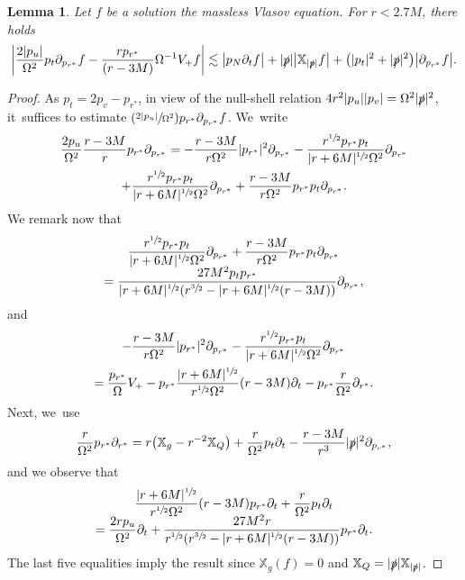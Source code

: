 \documentclass[JEP,XML,SOM,Unicode,published]{cedram}
\newcommand{\Psfrac}[2]{(\sfrac{#1}{#2})}
\theoremstyle{plain}
\newtheorem{lemma}[proposition]{Lemma}
\theoremstyle{definition}
\newcommand\T{{\mathbb{X}}}
\begin{document}
\begin{lemma}\label{LemBoundpartialpr}
Let $f$ be a solution the massless Vlasov equation. For $r < 2.7M$, there holds\vspace*{-3pt}
\[
\bigg| \frac{2|p_u|}{\Omega^2} p_t \partial_{p_{r^*}} f-\frac{rp_{r^*}}{(r-3M)} \Omega^{-1} V_+ f \bigg| \lesssim \big| p_N \partial_t f \big|+|\slashed{p}|\big| \T_{|\slashed{p}|} f \big|+ \bigl(|p_t|^2+ |\slashed{p}|^2\bigr) \big| \partial_{p_{r^*}} f \big|.
\]
\end{lemma}
\begin{proof}
As $p_t=2p_v-p_{r^*}$, in view of the null-shell relation $4r^2|p_u||p_v|=\Omega^2 |\slashed{p}|^2$, it~suffices to estimate $\Psfrac{2|p_u|}{\Omega^2} p_{r^*} \partial_{p_{r^*}} f$. We~write\vspace*{-5pt}
\begin{multline*}
\frac{2p_u}{\Omega^2}\frac{r-3M}{r} p_{r^*} \partial_{p_{r^*}} = -\frac{r-3M}{r\Omega^2}|p_{r^*}|^2 \partial_{p_{r^*}}-\frac{r^{\sfrac{1}{2}}p_{r^*}p_t}{|r+6M|^{\sfrac{1}{2}} \Omega^2} \partial_{p_{r^*}} \\
+ \frac{r^{\sfrac{1}{2}} p_{r^*}p_t}{|r+6M|^{\sfrac{1}{2}} \Omega^2} \partial_{p_{r^*}}+\frac{r-3M}{r\Omega^2}p_{r^*}p_t \partial_{p_{r^*}}.
\end{multline*}
We remark now that\vspace*{-3pt}
\begin{multline*}
\frac{r^{\sfrac{1}{2}} p_{r^*}p_t}{|r+6M|^{\sfrac{1}{2}} \Omega^2} \partial_{p_{r^*}}+\frac{r-3M}{r\Omega^2}p_{r^*}p_t \partial_{p_{r^*}}\\[-5pt]
=\frac{27M^2p_tp_{r^*}}{|r+6M|^{\sfrac{1}{2}} (r^{\sfrac{3}{2}}-|r+6M|^{\sfrac{1}{2}} (r-3M))} \partial_{p_{r^*}},
\end{multline*}
and
\begin{multline*}
-\frac{r-3M}{r\Omega^2}|p_{r^*}|^2 \partial_{p_{r^*}}-\frac{r^{\sfrac{1}{2}}p_{r^*}p_t}{|r+6M|^{\sfrac{1}{2}} \Omega^2} \partial_{p_{r^*}}\\
= \frac{p_{r^*}}{\Omega} V_+-p_{r^*}\frac{|r+6M|^{\sfrac{1}{2}}}{r^{\sfrac{1}{2}}\Omega^2}(r-3M) \partial_t
-p_{r^*}\frac{r}{\Omega^2} \partial_{r^*}.
\end{multline*}
Next, we~use\vspace*{-3pt}
\begin{align*}
\frac{r}{\Omega^2} p_{r^*}\partial_{r^*}= r \bigl(\T_g-r^{-2} \T_Q \bigr)+\frac{r}{\Omega^2}p_t \partial_t-\frac{r-3M}{r^3}|\slashed{p}|^2 \partial_{p_{r^*}},
\end{align*}
and we observe that\vspace*{-5pt}
\begin{multline*}
\frac{|r+6M|^{\sfrac{1}{2}}}{r^{\sfrac{1}{2}}\Omega^2}(r-3M) p_{r^*} \partial_t+\frac{r}{\Omega^2}p_t \partial_t\\[-5pt]
=\frac{2rp_u}{\Omega^2} \partial_t+\frac{27M^2r}{r^{\sfrac{1}{2}}(r^{\sfrac{3}{2}}-|r+6M|^{\sfrac{1}{2}}(r-3M))} p_{r^*} \partial_t.
\end{multline*}
The last five equalities imply the result since $\T_g (f)=0$ and $\T_Q=|\slashed{p}|\T_{|\slashed{p}|}$.
\end{proof}
\end{document}
